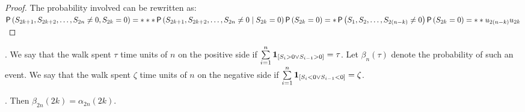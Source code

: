 \begin{proof}
 The probability involved can be rewritten as: $\operatorname{\textsf{P}} \left( S_{2k+1}, S_{2k+2}, \ldots, S_{2n}\neq 0, S_{2k}=0 \right) =***\operatorname{\textsf{P}} \left( S_{2k+1}, S_{2k+2}, \ldots, S_{2n}\neq 0\mid S_{2k}=0 \right) \operatorname{\textsf{P}} \left( S_{2k}=0 \right) =*\operatorname{\textsf{P}} \left( S_{1}, S_{2}, \ldots, S_{2 \left( n-k \right) }\neq 0 \right) \operatorname{\textsf{P}} \left( S_{2k}=0 \right) =**u_{2 \left( n-k \right) }u_{2k}$
\end{proof}
\begin{defn}
 \Lrw. We say that the walk spent $\tau$ time units of $n$ on the positive side if $\suma \indikator{S_i>0 \lor S_{i-1}>0}=\tau$. Let $\beta_{n} \left( \tau \right) $ denote the probability of such an event. We say that the walk spent $\zeta$ time units of $n$ on the negative side if $\suma\indikator{S_i<0 \lor S_{i-1}<0}=\zeta$.
\end{defn}
\begin{thm}\label{thm-arcsine_sojourn_times}
 \Lrws. Then $\beta_{2n} \left( 2k \right) =\alpha_{2n} \left( 2k \right) $.
\end{thm}
